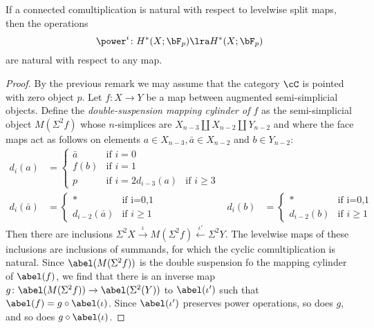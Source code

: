 \begin{lemma}
    If a connected comultiplication is natural with respect to levelwise split maps, then the operations
    \[
        \power^i\colon H^*(X;\bF_p)\lra H^*(X;\bF_p)
    \]
    are natural with respect to any map.
\end{lemma}
\begin{proof}
    By the previous remark we may assume that the category $\cC$ is pointed with zero object $p$. Let $f\colon X\to Y$ be a map between augmented semi-simplicial objects. Define the \emph{double-suspension mapping cylinder of $f$} as the semi-simplicial object $M(\Sigma^2 f)$ whose $n$-simplices are $X_{n-3}\amalg X_{n-2}\amalg Y_{n-2}$ and where the face maps act as follows on elements $a\in X_{n-3}, \bar{a}\in X_{n-2}$ and $b\in Y_{n-2}$:
    \begin{align*}
        d_i(a) &= \begin{cases}
            \bar{a} & \text{if $i=0$} \\
            f(b) & \text{if $i=1$} \\
            p & \text{if $i=2$}
            d_{i-3}(a) & \text{if $i\geq 3$}
        \end{cases}
        &\\
        d_i(\bar{a}) &= \begin{cases}
            * & \text{if i=0,1} \\
            d_{i-2}(\bar{a}) & \text{if $i\geq 1$} 
        \end{cases}
        & 
        d_i(b) &= \begin{cases}
            * & \text{if i=0,1} \\
            d_{i-2}(b) & \text{if $i\geq 1$} 
        \end{cases}
    \end{align*}
    Then there are inclusions $\Sigma^2 X\overset{\iota}{\to} M(\Sigma^2f) \overset{\iota'}{\leftarrow} \Sigma^2 Y$. The levelwise maps of these inclusions are inclusions of summands, for which the cyclic comultiplication is natural. Since $\abel(M(\Sigma^2 f))$ is the double suspension fo the mapping cylinder of $\abel(f)$, we find that there is an inverse map $g\colon \abel(M(\Sigma^2 f))\to \abel(\Sigma^2(Y))$ to $\abel(\iota')$ such that $\abel(f) = g\circ \abel(\iota)$. Since $\abel(\iota')$ preserves power operations, so does $g$, and so does $g\circ \abel(\iota)$.
\end{proof}




